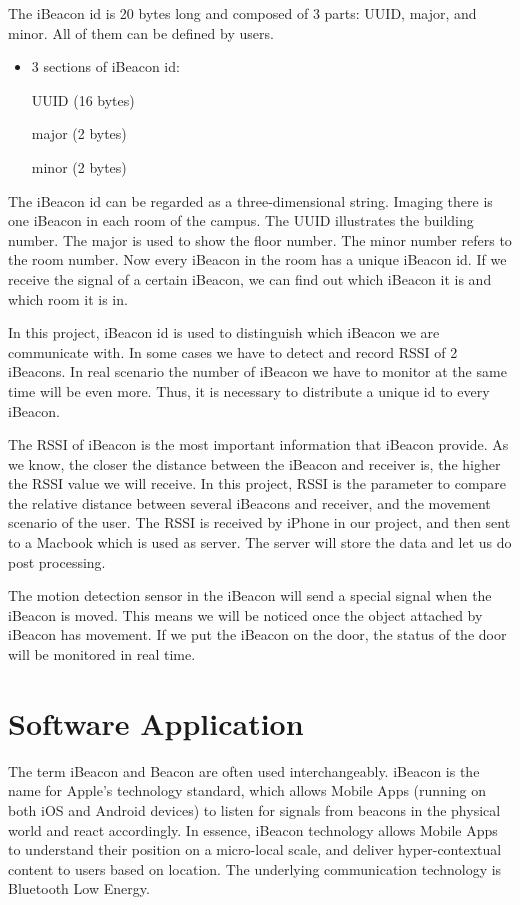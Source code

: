 \documentclass[12pt]{report}
\begin{document}
The iBeacon id is 20 bytes long and composed of 3 parts: UUID, major, and minor. All of them can be defined by users. 

\begin{itemize}
\item 3 sections of iBeacon id:

 UUID (16 bytes)

 major (2 bytes)

 minor (2 bytes)

\end{itemize}

The iBeacon id can be regarded as a three-dimensional string. Imaging there is one iBeacon in each room of the campus. The UUID illustrates the building number. The major is used to show the floor number. The minor number refers to the room number. Now every iBeacon in the room has a unique iBeacon id. If we receive the signal of a certain iBeacon, we can find out which iBeacon it is and which room it is in.

In this project, iBeacon id is used to distinguish which iBeacon we are communicate with. In some cases we have to detect and record RSSI of 2 iBeacons. In real scenario the number of iBeacon we have to monitor at the same time will be even more. Thus, it is necessary to distribute a unique id to every iBeacon.

The RSSI of iBeacon is the most important information that iBeacon provide. As we know, the closer the distance between the iBeacon and receiver is, the higher the RSSI value we will receive. In this project, RSSI is the parameter to compare the relative distance between several iBeacons and receiver, and the movement scenario of the user. The RSSI is received by iPhone in our project, and then sent to a Macbook which is used as server. The server will store the data and let us do post processing.

The motion detection sensor in the iBeacon will send a special signal when the iBeacon is moved. This means we will be noticed once the object attached by iBeacon has movement. If we put the iBeacon on the door, the status of the door will be monitored in real time.

\section{Software Application}
The term iBeacon and Beacon are often used interchangeably. iBeacon is the name for Apple’s technology standard, which allows Mobile Apps (running on both iOS and Android devices) to listen for signals from beacons in the physical world and react accordingly. In essence, iBeacon technology allows Mobile Apps to understand their position on a micro-local scale, and deliver hyper-contextual content to users based on location. The underlying communication technology is Bluetooth Low Energy.
\end{document}
